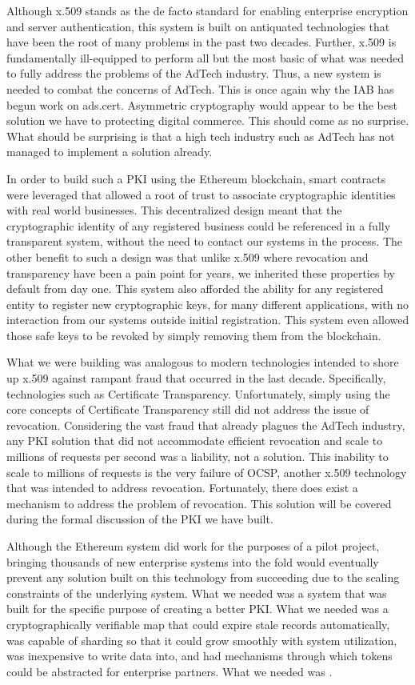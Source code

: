 Although x.509 stands as the de facto standard for enabling enterprise
encryption and server authentication, this system is built on
antiquated technologies that have been the root of many problems in the
past two decades.
Further, x.509 is fundamentally ill-equipped to perform all but the
most basic of what was needed to fully address the problems of the
AdTech industry.
Thus, a new system is needed to combat the concerns of AdTech.
This is once again why the IAB has begun work on ads.cert.
Asymmetric cryptography would appear to be the best solution we have to
protecting digital commerce.
This should come as no surprise.
What should be surprising is that a high tech industry such as AdTech
has not managed to implement a solution already.

In order to build such a PKI using the Ethereum blockchain, smart
contracts were leveraged that allowed a root of trust to associate
cryptographic identities with real world businesses.
This decentralized design meant that the cryptographic identity of any
registered business could be referenced in a fully transparent system,
without the need to contact our systems in the process.
The other benefit to such a design was that unlike x.509 where
revocation and transparency have been a pain point for years, we
inherited these properties by default from day one.
This system also afforded the ability for any registered entity to
register new cryptographic keys, for many different applications, with
no interaction from our systems outside initial registration.
This system even allowed those safe keys to be revoked by simply
removing them from the blockchain.

What we were building was analogous to modern technologies intended to
shore up x.509 against rampant fraud that occurred in the last decade.
Specifically, technologies such as Certificate Transparency.
Unfortunately, simply using the core concepts of Certificate
Transparency still did not address the issue of revocation.
Considering the vast fraud that already plagues the AdTech industry,
any PKI solution that did not accommodate efficient revocation and
scale to millions of requests per second was a liability, not a
solution.
This inability to scale to millions of requests is the very failure of
OCSP, another x.509 technology that was intended to address revocation.
Fortunately, there does exist a mechanism to address the problem of
revocation.
This solution will be covered during the formal discussion of the PKI
we have built.

Although the Ethereum system did work for the purposes of a pilot
project, bringing thousands of new enterprise systems into the fold
would eventually prevent any solution built on this technology from
succeeding due to the scaling constraints of the underlying system.
What we needed was a system that was built for the specific purpose of
creating a better PKI.
What we needed was a cryptographically verifiable map that could expire
stale records automatically, was capable of sharding so that it could
grow smoothly with system utilization, was inexpensive to write data
into, and had mechanisms through which tokens could be abstracted for
enterprise partners.
What we needed was \LayerTwo{}.

